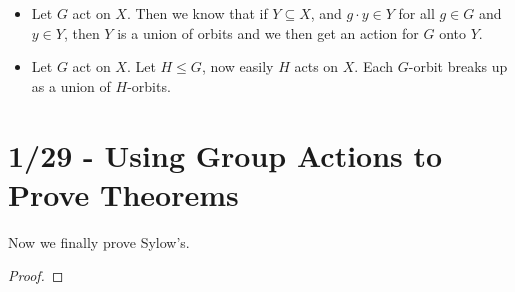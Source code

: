 \documentclass{report}
\begin{document}
\begin{itemize}
    \item Let $G$ act on $X$. Then we know that if $Y \subseteq X$, and $g \cdot y \in Y$ for all $g \in G$ and $y \in Y$, then $Y$ is a union of orbits and we then get an action for $G$ onto $Y$.
    \item Let $G$ act on $X$. Let $H \leq G$, now easily $H$ acts on $X$. Each $G$-orbit breaks up as a union of $H$-orbits.
\end{itemize}
\newpage
\section{1/29 - Using Group Actions to Prove Theorems}
Now we finally prove Sylow's.
\begin{proof}
    
\end{proof}
\end{document}
